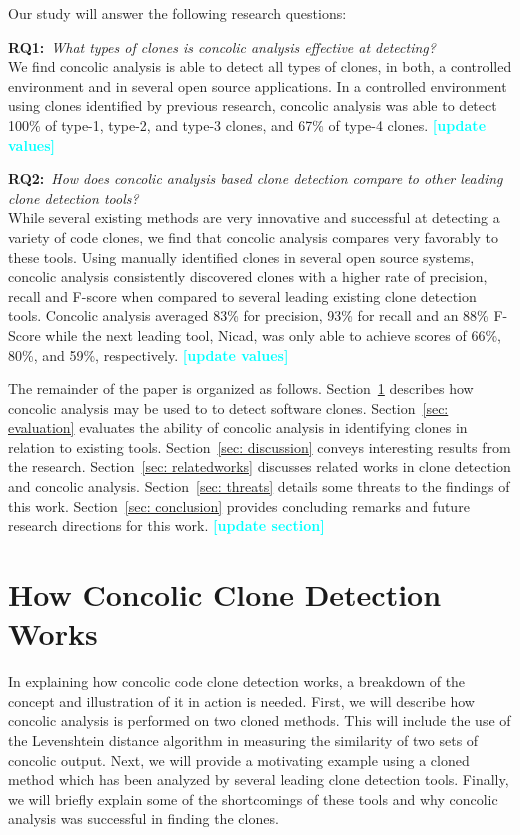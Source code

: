 \documentclass[smallextended]{svjour3}       %
\newcommand{\todo}[1]{\textcolor{cyan}{\textbf{[#1]}}}
\begin{document}
Our study will answer the following research questions:

\textbf{RQ1:}~\emph{What types of clones is concolic analysis effective at detecting?}\\
We find concolic analysis is able to detect all types of clones, in both, a controlled environment and in several open source applications. In a controlled environment using clones identified by previous research, concolic analysis was able to detect 100\% of type-1, type-2, and type-3 clones, and 67\% of type-4 clones.
\todo{update values}

\textbf{RQ2:}~\emph{How does concolic analysis based clone detection compare to other leading clone detection tools?}\\
While several existing methods are very innovative and successful at detecting a variety of code clones, we find that concolic analysis compares very favorably to these tools. Using manually identified clones in several open source systems, concolic analysis consistently discovered clones with a higher rate of precision, recall and F-score when compared to several leading existing clone detection tools. Concolic analysis averaged 83\% for precision, 93\% for recall and an 88\% F-Score while the next leading tool, Nicad, was only able to achieve scores of 66\%, 80\%, and 59\%, respectively.
\todo{update values}


The remainder of the paper is organized as follows. Section~\ref{sec: howconcolicworks} describes how concolic analysis may be used to to detect software clones. Section~\ref{sec: evaluation} evaluates the ability of concolic analysis in identifying clones in relation to existing tools. Section~\ref{sec: discussion} conveys interesting results from the research. Section~\ref{sec: relatedworks} discusses related works in clone detection and concolic analysis. Section~\ref{sec: threats} details some threats to the findings of this work. Section~\ref{sec: conclusion} provides concluding remarks and future research directions for this work.
\todo{update section}


\vspace{-0.08in}
\section{How Concolic Clone Detection Works}
\label{sec: howconcolicworks}

In explaining how concolic code clone detection works, a breakdown of the concept and illustration of it in action is needed. First, we will describe how concolic analysis is performed on two cloned methods. This will include the use of the Levenshtein distance algorithm in measuring the similarity of two sets of concolic output. Next, we will provide a motivating example using a cloned method which has been analyzed by several leading clone detection tools. Finally, we will briefly explain some of the shortcomings of these tools and why concolic analysis was successful in finding the clones.
\end{document}
